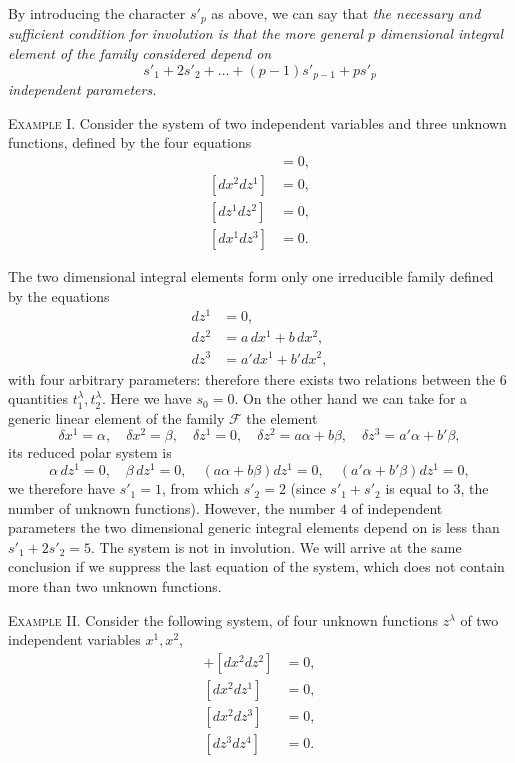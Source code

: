 \begin{rmk*} By introducing  the character $s'_{p}$ as above, we can say that \emph{the necessary and sufficient condition for involution is that the more general $p$ dimensional integral element of the family considered depend on}
\[
s'_{1}+2s'_{2}+\dots+(p-1)s'_{p-1}+ps'_{p}
\]
\emph{independent parameters.}
  
\end{rmk*}



\vspace{12pt}\fsec \textsc{Example I.} Consider the system of two independent variables and three unknown functions, defined by the four equations
\begin{align*}
  [dx^{1}dz^{1}]&=0,\\
  [dx^{2}dz^{1}]&=0,\\
  [dz^{1}dz^{2}]&=0,\\
  [dx^{1}dz^{3}]&=0.
\end{align*}

The two dimensional integral elements form only one irreducible family defined by the equations
\begin{align*}
  dz^{1}&=0,\\
  dz^{2}&=a\,dx^{1}+b\,dx^{2},\\
  dz^{3}&=a'dx^{1}+b'dx^{2},
\end{align*}
with four arbitrary parameters: therefore there exists two relations between the $6$ quantities $t_{1}^{\lambda},t_{2}^{\lambda}$. Here we have $s_{0}=0$. On the other hand we can take for a generic linear element of the family $\mathcal{F}$ the element
\[
\delta x^{1}=\alpha,\quad \delta x^{2}=\beta,\quad \delta z^{1}=0,\quad \delta z^{2}=a\alpha+b\beta,\quad \delta z^{3}=a'\alpha+b'\beta,
\]
its reduced polar system is
\[
\alpha\,dz^{1}=0,\quad \beta\, dz^{1}=0,\quad(a\alpha+b\beta)dz^{1}=0,\quad(a'\alpha+b'\beta)dz^{1}=0,
\]
we therefore have $s'_{1}=1$, from which $s'_{2}=2$ (since $s'_{1}+s'_{2}$ is equal to $3$, the number of unknown functions). However, the number $4$ of independent parameters the two dimensional generic integral elements depend on is less than $s'_{1}+2s'_{2}=5$. The system is not in involution. We will arrive at the same conclusion if we suppress the last equation of the system, which does not contain more than two unknown functions.


\vspace{12pt}\fsec \textsc{Example II.} Consider the following system, of four unknown functions $z^{\lambda}$ of two independent variables $x^{1},x^{2}$,
\begin{align*}
  [dx^{1}dz^{1}]+[dx^{2}dz^{2}]&=0,\\
  [dx^{2}dz^{1}]&=0,\\
  [dx^{2}dz^{3}]&=0,\\
  [dz^{3}dz^{4}]&=0.
\end{align*}


